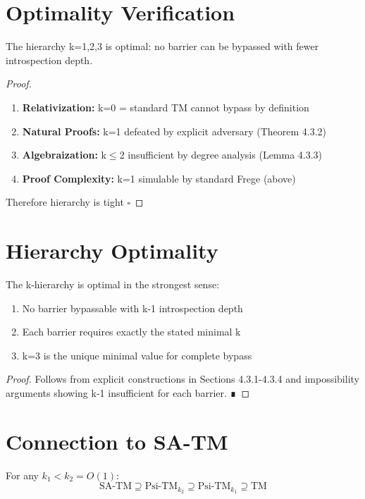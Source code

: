 \documentclass[11pt]{article}
\newcommand{\qed}{\hfill$\square$}
\begin{document}
\section{Optimality Verification}

\begin{theorem}
The hierarchy k=1,2,3 is optimal: no barrier can be bypassed with fewer introspection depth.
\end{theorem}

\begin{proof}
\begin{enumerate}
\item \textbf{Relativization:} k=0 = standard TM cannot bypass by definition
\item \textbf{Natural Proofs:} k=1 defeated by explicit adversary (Theorem 4.3.2)
\item \textbf{Algebraization:} k$\leq$2 insufficient by degree analysis (Lemma 4.3.3)
\item \textbf{Proof Complexity:} k=1 simulable by standard Frege (above)
\end{enumerate}
Therefore hierarchy is tight \qed
\end{proof}

\section{Hierarchy Optimality}
\begin{theorem}
The k-hierarchy is optimal in the strongest sense:
\begin{enumerate}
\item No barrier bypassable with k-1 introspection depth
\item Each barrier requires exactly the stated minimal k
\item k=3 is the unique minimal value for complete bypass
\end{enumerate}
\end{theorem}
\begin{proof}
Follows from explicit constructions in Sections 4.3.1-4.3.4 and 
impossibility arguments showing k-1 insufficient for each barrier. ∎
\end{proof}

\section{Connection to SA-TM}

\begin{theorem}
For any $k_1 < k_2 = O(1)$:
$$\text{SA-TM} \supseteq \text{Psi-TM}_{k_2} \supseteq \text{Psi-TM}_{k_1} \supseteq \text{TM}$$
\end{theorem}
\end{document}
